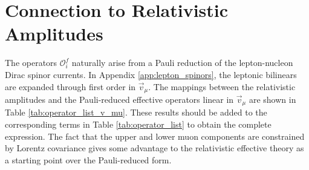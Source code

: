 \documentclass{book}[letterpaper,12pt]
\begin{document}
\section{Connection to Relativistic Amplitudes}
The operators $\mathcal{O}^f_i$ naturally arise from a Pauli reduction of the lepton-nucleon Dirac spinor currents. In Appendix \ref{app:lepton_spinors}, the leptonic bilinears are expanded through first order in $\vec{v}_{\mu}$. The mappings between the relativistic amplitudes and the Pauli-reduced effective operators linear in $\vec{v}_{\mu}$ are shown in Table \ref{tab:operator_list_v_mu}. These results should be added to the corresponding terms in Table \ref{tab:operator_list} to obtain the complete expression. The fact that the upper and lower muon components are constrained by Lorentz covariance gives some advantage to the relativistic effective theory as a starting point over the Pauli-reduced form.
\end{document}

